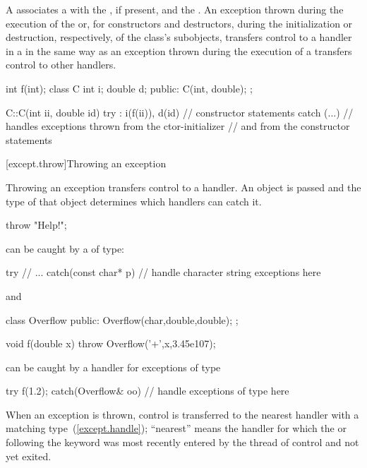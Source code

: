 \pnum
{}%
%
A
associates a
with the
,
if present, and the
.
An exception
thrown during the execution of the
or, for constructors and destructors, during the initialization or
destruction, respectively, of the class's subobjects,
transfers control to a handler in a
in the same way as an exception thrown during the execution of a
transfers control to other handlers.
\enterexample
\begin{codeblock}
int f(int);
class C {
  int i;
  double d;
public:
  C(int, double);
};

C::C(int ii, double id)
try : i(f(ii)), d(id) {
    // constructor statements
}
catch (...) {
    // handles exceptions thrown from the ctor-initializer
    // and from the constructor statements
}

\end{codeblock}
\exitexample


[except.throw]{Throwing an exception}%
%

\pnum
Throwing an exception transfers control to a handler.
An object is passed and the type of that object determines which handlers
can catch it.
\enterexample
\begin{codeblock}
throw "Help!";
\end{codeblock}
can be caught by a
of
type:
\begin{codeblock}
try {
    // ...
}
catch(const char* p) {
    // handle character string exceptions here
}
\end{codeblock}
and
\begin{codeblock}
class Overflow {
public:
    Overflow(char,double,double);
};

void f(double x) {
    throw Overflow('+',x,3.45e107);
}
\end{codeblock}
can be caught by a handler for exceptions of type
\begin{codeblock}
try {
    f(1.2);
} catch(Overflow& oo) {
    // handle exceptions of type  here
}
\end{codeblock}
\exitexample

\pnum
{}%
%
%
When an exception is thrown, control is transferred to the nearest handler with
a matching type~(\ref{except.handle}); ``nearest'' means the handler
for which the
 or
following the
keyword was most recently entered by the thread of control and not yet exited.

